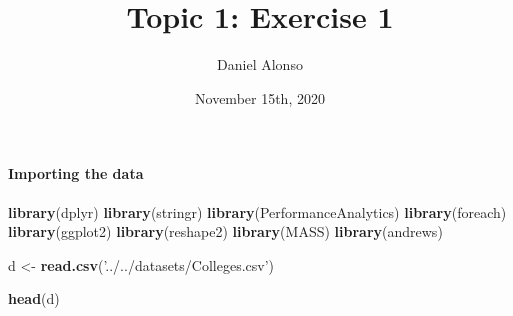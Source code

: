 \documentclass[]{article}
\title{Topic 1: Exercise 1}
\author{Daniel Alonso}
\date{November 15th, 2020}
\newenvironment{Shaded}{\begin{snugshade}}{\end{snugshade}}
\newcommand{\KeywordTok}[1]{\textcolor[rgb]{0.13,0.29,0.53}{\textbf{#1}}}
\newcommand{\NormalTok}[1]{#1}
\newcommand{\StringTok}[1]{\textcolor[rgb]{0.31,0.60,0.02}{#1}}
\let\oldparagraph\paragraph
\renewcommand{\paragraph}[1]{\oldparagraph{#1}\mbox{}}
\begin{document}
\maketitle

\hypertarget{importing-the-data}{%
\paragraph{Importing the data}\label{importing-the-data}}

\begin{Shaded}
\begin{Highlighting}[]
\KeywordTok{library}\NormalTok{(dplyr)}
\KeywordTok{library}\NormalTok{(stringr)}
\KeywordTok{library}\NormalTok{(PerformanceAnalytics)}
\KeywordTok{library}\NormalTok{(foreach)}
\KeywordTok{library}\NormalTok{(ggplot2)}
\KeywordTok{library}\NormalTok{(reshape2)}
\KeywordTok{library}\NormalTok{(MASS)}
\KeywordTok{library}\NormalTok{(andrews)}
\end{Highlighting}
\end{Shaded}

\begin{Shaded}
\begin{Highlighting}[]
\NormalTok{d <-}\StringTok{ }\KeywordTok{read.csv}\NormalTok{(}\StringTok{'../../datasets/Colleges.csv'}\NormalTok{)}
\end{Highlighting}
\end{Shaded}

\begin{Shaded}
\begin{Highlighting}[]
\KeywordTok{head}\NormalTok{(d)}
\end{Highlighting}
\end{Shaded}
\end{document}
